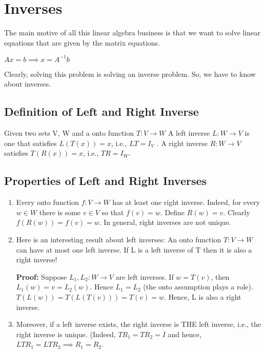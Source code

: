\section{Inverses}

The main motive of all this linear algebra business is that we want to solve linear equations that are given by the matrix equations.

$Ax=b \implies x = A^{-1}b$

Clearly, solving this problem is solving an inverse problem. So, we have to know about inverses.

\subsection{Definition of Left and Right Inverse}

\begin{ouline}
Given two sets V, W and a onto function $T: V \to W$ A left inverse $L : W \to V$ is one that satisfies $L(T(x)) = x$, i.e.,
$LT = I_V$ . A right inverse $R : W \to V $satisfies $T(R(x)) = x$,
i.e., $TR = I_W$.
\end{ouline}

\subsection{Properties of Left and Right Inverses}

\begin{enumerate}
    \item Every onto function $f : V \to W$ has at least one right inverse.
Indeed, for every $w \in W$ there is some $v \in V$ so that
$f (v) = w$. Define $R(w) = v$. Clearly $f (R(w)) = f (v) = w$.
In general, right inverses are not unique.

\item 
Here is an interesting result about left inverses: An onto
function $T : V \to W$ can have at most one left inverse. If L is
a left inverse of T then it is also a right inverse!

\textbf{Proof:} Suppose $L_1, L_2 : W \to V$ are left inverses. If
$w = T(v)$, then $L_1(w) = v = L_2(w)$. Hence $L_1 = L_2$ (the
onto assumption plays a role).
$T(L(w)) = T(L(T(v))) = T(v) = w$. Hence, L is also a right
inverse.
\item 
Moreover, if a left inverse exists, the right inverse is THE left
inverse, i.e., the right inverse is unique. (Indeed,
$TR_1 = TR_2 = I$ and hence, $ LTR_1 = LTR_2 \implies R_1 = R_2$.
\end{enumerate}


